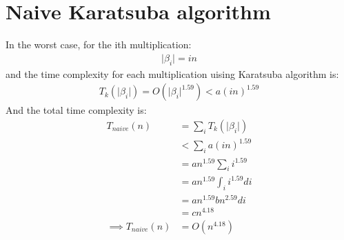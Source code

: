 \documentclass{article}
\begin{document}
\section{Naive Karatsuba algorithm}
In the worst case, for the ith multiplication:
\begin{align*}
\vert \beta_i \vert = in
\end{align*}
and the time complexity for each multiplication uising Karatsuba algorithm is:
\begin{align*}
T_k(\vert \beta_i \vert) = O(\vert \beta_i \vert^{1.59}) < a (in)^{1.59}
\end{align*}
And the total time complexity is:
\begin{align*}
T_{naive}(n)
&= \sum_i T_k(\vert \beta_i \vert)\\
&< \sum_i a (in)^{1.59}\\
&= a n^{1.59} \sum_i  i^{1.59}\\
&= a n^{1.59} \int_i  i^{1.59} di\\
&= a n^{1.59} b n^{2.59} di\\
&= c n^{4.18}\\
\implies T_{naive}(n) &= O(n^{4.18})
\end{align*}
\end{document}

